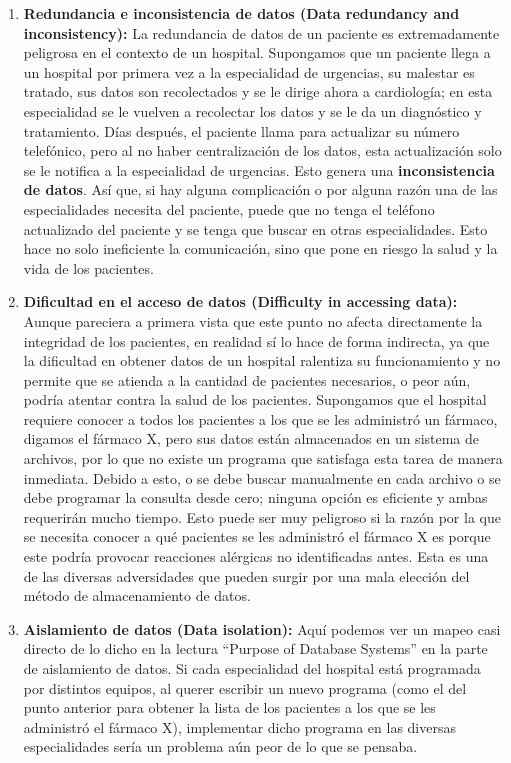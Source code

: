\begin{enumerate}
    \item \textbf{Redundancia e inconsistencia de datos (Data redundancy and inconsistency):} La redundancia de datos de un paciente es extremadamente peligrosa en el contexto de un hospital. Supongamos que un paciente llega a un hospital por primera vez a la especialidad de urgencias, su malestar es tratado, sus datos son recolectados y se le dirige ahora a cardiología; en esta especialidad se le vuelven a recolectar los datos y se le da un diagnóstico y tratamiento. Días después, el paciente llama para actualizar su número telefónico, pero al no haber centralización de los datos, esta actualización solo se le notifica a la especialidad de urgencias. Esto genera una \textbf{inconsistencia de datos}. Así que, si hay alguna complicación o por alguna razón una de las especialidades necesita del paciente, puede que no tenga el teléfono actualizado del paciente y se tenga que buscar en otras especialidades. Esto hace no solo ineficiente la comunicación, sino que pone en riesgo la salud y la vida de los pacientes.

    \item \textbf{Dificultad en el acceso de datos (Difficulty in accessing data):} Aunque pareciera a primera vista que este punto no afecta directamente la integridad de los pacientes, en realidad sí lo hace de forma indirecta, ya que la dificultad en obtener datos de un hospital ralentiza su funcionamiento y no permite que se atienda a la cantidad de pacientes necesarios, o peor aún, podría atentar contra la salud de los pacientes. Supongamos que el hospital requiere conocer a todos los pacientes a los que se les administró un fármaco, digamos el fármaco X, pero sus datos están almacenados en un sistema de archivos, por lo que no existe un programa que satisfaga esta tarea de manera inmediata. Debido a esto, o se debe buscar manualmente en cada archivo o se debe programar la consulta desde cero; ninguna opción es eficiente y ambas requerirán mucho tiempo. Esto puede ser muy peligroso si la razón por la que se necesita conocer a qué pacientes se les administró el fármaco X es porque este podría provocar reacciones alérgicas no identificadas antes. Esta es una de las diversas adversidades que pueden surgir por una mala elección del método de almacenamiento de datos.

    \item \textbf{Aislamiento de datos (Data isolation):} Aquí podemos ver un mapeo casi directo de lo dicho en la lectura ``Purpose of Database Systems'' \cite{PurposeDatabaseSystems} en la parte de aislamiento de datos. Si cada especialidad del hospital está programada por distintos equipos, al querer escribir un nuevo programa (como el del punto anterior para obtener la lista de los pacientes a los que se les administró el fármaco X), implementar dicho programa en las diversas especialidades sería un problema aún peor de lo que se pensaba.


\end{enumerate}
